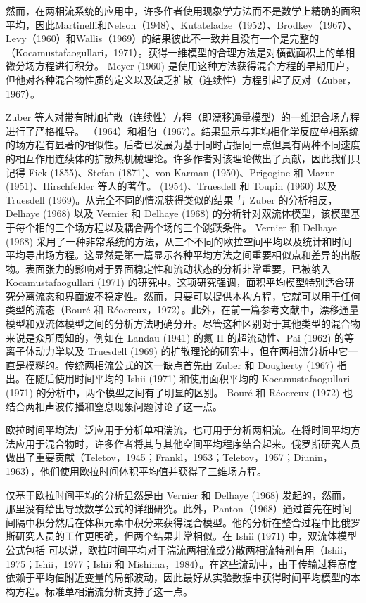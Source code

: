 \documentclass[11pt,a4paper,openany,fontset=none]{ctexbook}
\begin{document}
然而，在两相流系统的应用中，许多作者使用现象学方法而不是数学上精确的面积平均，因此Martinelli和Nelson（1948）、Kutateladze（1952）、Brodkey（1967）、Levy（1960）和Wallis（1969）的结果彼此不一致并且没有一个是完整的（Kocamustafaogullari，1971）。获得一维模型的合理方法是对横截面积上的单相微分场方程进行积分。 Meyer (1960) 是使用这种方法获得混合方程的早期用户，但他对各种混合物性质的定义以及缺乏扩散（连续性）方程引起了反对（Zuber，1967）。

Zuber 等人对带有附加扩散（连续性）方程（即漂移通量模型）的一维混合场方程进行了严格推导。 （1964）和祖伯（1967）。结果显示与非均相化学反应单相系统的场方程有显著的相似性。后者已发展为基于同时占据同一点但具有两种不同速度的相互作用连续体的扩散热机械理论。许多作者对该理论做出了贡献，因此我们只记得 Fick (1855)、Stefan (1871)、von Karman (1950)、Prigogine 和 Mazur (1951)、Hirschfelder 等人的著作。 (1954)、Truesdell 和 Toupin (1960) 以及 Truesdell (1969)。从完全不同的情况获得类似的结果
与 Zuber 的分析相反，Delhaye (1968) 以及 Vernier 和 Delhaye (1968) 的分析针对双流体模型，该模型基于每个相的三个场方程以及耦合两个场的三个跳跃条件。 Vernier 和 Delhaye (1968) 采用了一种非常系统的方法，从三个不同的欧拉空间平均以及统计和时间平均导出场方程。这显然是第一篇显示各种平均方法之间重要相似点和差异的出版物。表面张力的影响对于界面稳定性和流动状态的分析非常重要，已被纳入 Kocamustafaogullari (1971) 的研究中。这项研究强调，面积平均模型特别适合研究分离流态和界面波不稳定性。然而，只要可以提供本构方程，它就可以用于任何类型的流态（Bouré 和 Réocreux，1972）。此外，在前一篇参考文献中，漂移通量模型和双流体模型之间的分析方法明确分开。尽管这种区别对于其他类型的混合物来说是众所周知的，例如在 Landau (1941) 的氦 II 的超流动性、Pai (1962) 的等离子体动力学以及 Truesdell (1969) 的扩散理论的研究中，但在两相流分析中它一直是模糊的。传统两相流公式的这一缺点首先由 Zuber 和 Dougherty (1967) 指出。在随后使用时间平均的 Ishii (1971) 和使用面积平均的 Kocamustafaogullari (1971) 的分析中，两个模型之间有了明显的区别。 Bouré 和 Réocreux (1972) 也结合两相声波传播和窒息现象问题讨论了这一点。

欧拉时间平均法广泛应用于分析单相湍流，也可用于分析两相流。在将时间平均方法应用于混合物时，许多作者将其与其他空间平均程序结合起来。俄罗斯研究人员做出了重要贡献（Teletov，1945；Frankl，1953；Teletov，1957；Diunin，1963），他们使用欧拉时间体积平均值并获得了三维场方程。

仅基于欧拉时间平均的分析显然是由 Vernier 和 Delhaye (1968) 发起的，然而，那里没有给出导致数学公式的详细研究。此外，Panton（1968）通过首先在时间间隔中积分然后在体积元素中积分来获得混合模型。他的分析在整合过程中比俄罗斯研究人员的工作更明确，但两个结果非常相似。在 Ishii (1971) 中，双流体模型公式包括
可以说，欧拉时间平均对于湍流两相流或分散两相流特别有用（Ishii，1975；Ishii，1977；Ishii 和 Mishima，1984）。在这些流动中，由于传输过程高度依赖于平均值附近变量的局部波动，因此最好从实验数据中获得时间平均模型的本构方程。标准单相湍流分析支持了这一点。
\end{document}
